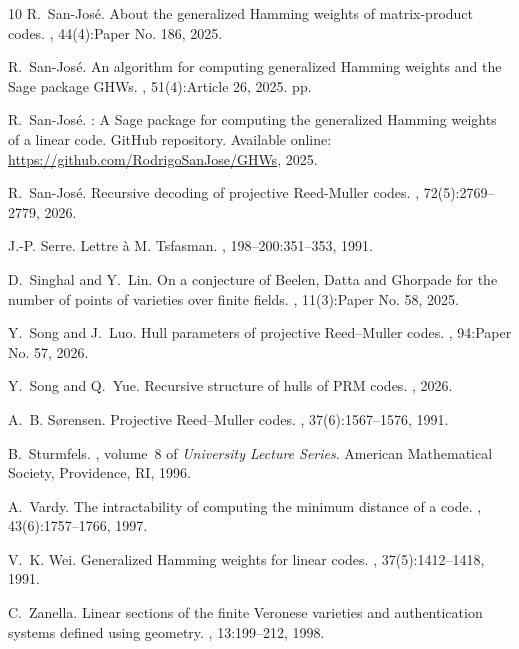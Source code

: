 \documentclass[11pt]{amsart}
\theoremstyle{definition}
\numberwithin{equation}{section}
\begin{document}
\begin{thebibliography}{10}
R.~San-Jos\'e.
\newblock About the generalized {H}amming weights of matrix-product codes.
, 44(4):Paper No. 186, 2025.

R.~San-Jos\'{e}.
\newblock An algorithm for computing generalized {H}amming weights and the {S}age package {GHWs}.
, 51(4):Article 26, 2025.
 pp.

R.~San-Jos\'{e}.
: A {S}age package for computing the generalized {H}amming weights of a linear code. {G}it{H}ub repository.
\newblock Available online: \url{https://github.com/RodrigoSanJose/GHWs}, 2025.

R.~San-Jos\'e.
\newblock Recursive decoding of projective {R}eed-{M}uller codes.
, 72(5):2769--2779, 2026.

J.-P. Serre.
\newblock Lettre {\`a} {M. Tsfasman}.
, 198--200:351--353, 1991.

D.~Singhal and Y.~Lin.
\newblock On a conjecture of {Beelen, Datta and Ghorpade} for the number of points of varieties over finite fields.
, 11(3):Paper No. 58, 2025.

Y.~Song and J.~Luo.
\newblock Hull parameters of projective {Reed--Muller} codes.
, 94:Paper No. 57, 2026.

Y.~Song and Q.~Yue.
\newblock Recursive structure of hulls of {PRM} codes.
, 2026.

A.~B. S{\o}rensen.
\newblock Projective {Reed--Muller} codes.
, 37(6):1567--1576, 1991.

B.~Sturmfels.
, volume~8 of {\em University Lecture Series}.
\newblock American Mathematical Society, Providence, RI, 1996.

A.~Vardy.
\newblock The intractability of computing the minimum distance of a code.
, 43(6):1757--1766, 1997.

V.~K. Wei.
\newblock Generalized {Hamming} weights for linear codes.
, 37(5):1412--1418, 1991.

C.~Zanella.
\newblock Linear sections of the finite {Veronese} varieties and authentication systems defined using geometry.
, 13:199--212, 1998.

\end{thebibliography}


% 
% 
\end{document}
